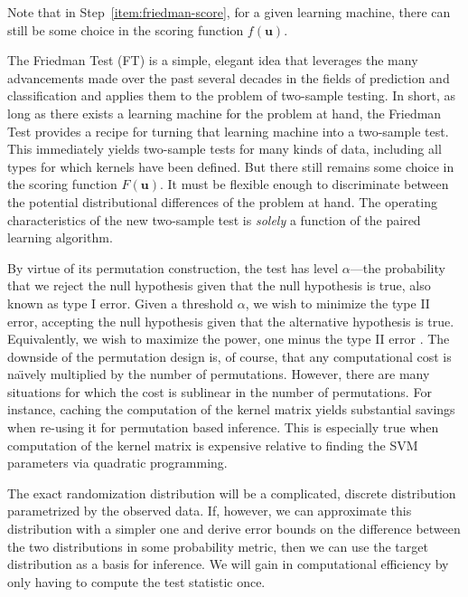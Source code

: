 Note that in Step~\ref{item:friedman-score}, for a given learning
machine, there can still be some choice in the scoring function
$f(\mathbf{u})$.

The Friedman Test (FT) is a simple, elegant idea that leverages the
many advancements made over the past several decades in the fields of
prediction and classification and applies them to the problem of
two-sample testing.  In short, as long as there exists a learning
machine for the problem at hand, the Friedman Test provides a recipe
for turning that learning machine into a two-sample test.  This
immediately yields two-sample tests for many kinds of data, including
all types for which kernels have been defined.
But there still remains some choice in the scoring
function $F(\mathbf{u})$.  It must be flexible enough to discriminate
between the potential distributional differences of the problem at
hand.  The operating characteristics of the new two-sample test is
\emph{solely} a function of the paired learning algorithm.

By virtue of its permutation construction, the test has level $\alpha$---the
probability that we reject the null hypothesis given
that the null hypothesis is true, also known as type I error.  Given a
threshold $\alpha$, we wish to minimize the type II error, accepting
the null hypothesis given that the alternative hypothesis is true.
Equivalently, we wish to maximize the power, one minus the type II
error \cite{lehmann2005testing}.  The downside of the permutation
design is, of course, that any computational cost is na\"\i vely
multiplied by the number of permutations.  However, there are many
situations for which the cost is sublinear in the number of
permutations.  For instance, caching the computation of the kernel matrix
yields substantial savings when re-using it for permutation based
inference.  This is especially true when computation of the kernel
matrix is expensive relative to finding the SVM parameters via
quadratic programming.

The exact randomization distribution will be a complicated, discrete distribution
parametrized by the observed data.  If, however, we can approximate this
distribution with a simpler one and derive error bounds on the difference
between the two distributions in some probability metric, then we can
use the target distribution as a basis for inference.  We will gain in
computational efficiency by only having to compute the test statistic once.

